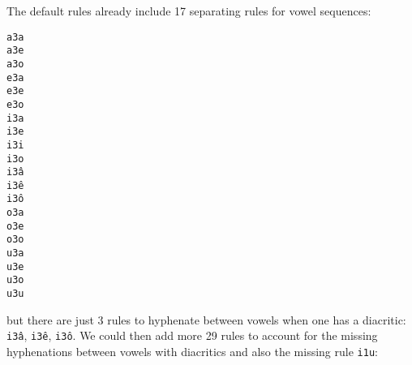 The default rules already include 17 separating rules for vowel sequences:
\begin{multicols}{5}
\setlength{\columnsep}{0pt}
\setlength{\parindent}{0pt}
\texttt{a3a \\ a3e \\ a3o \\ e3a \\ e3e \\ e3o \\ i3a \\ i3e \\ i3i \\ i3o \\ i3â \\ i3ê \\ i3ô \\ o3a \\ o3e \\ o3o \\ u3a \\ u3e \\ u3o \\ u3u}
\end{multicols}
\noindent{}but there are just 3 rules to hyphenate between vowels when one has a diacritic: \texttt{i3â}, \texttt{i3ê}, \texttt{i3ô}.
We could then add more 29 rules to account for the missing hyphenations between vowels with diacritics and also the
missing rule \texttt{i1u}:
